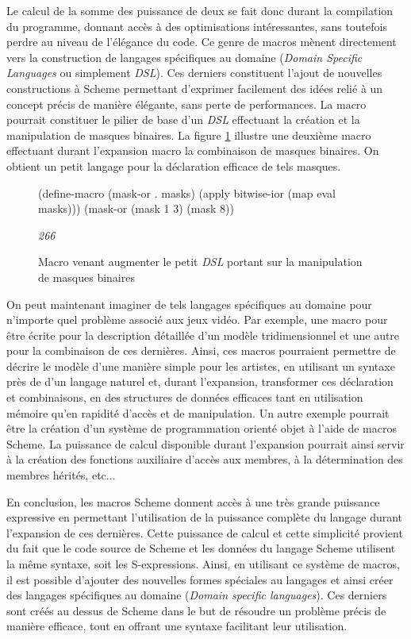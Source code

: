 \documentclass[12pt,oneside,letterpaper,francais]{book}
\newcommand{\scheme}[1]{\selectlanguage{english}{\tt #1}\selectlanguage{french}}
\newcommand{\schemeresult}[1]{{\it #1}}
\begin{document}
Le calcul de la somme des puissance de deux se fait donc durant la
compilation du programme, donnant accès à des optimisations
intéressantes, sans toutefois perdre au niveau de l'élégance du
code. Ce genre de macros mènent directement vers la construction de
langages spécifiques au domaine (\textit{Domain Specific Languages} ou
simplement \textit{DSL}). Ces derniers constituent l'ajout de
nouvelles constructions à Scheme permettant d'exprimer facilement des
idées relié à un concept précis de manière élégante, sans perte de
performances. La macro \scheme{mask} pourrait constituer le pilier de
base d'un \textit{DSL} effectuant la création et la manipulation de
masques binaires. La figure \ref{Scheme:macro-mini-dsl} illustre une
deuxième macro effectuant durant l'expansion macro la combinaison de
masques binaires. On obtient un petit langage pour la déclaration
efficace de tels masques. 

\begin{figure}[htb1]
  \begin{schemecode}
(define-macro (mask-or . masks)
  (apply bitwise-ior (map eval masks)))
(mask-or (mask 1 3) (mask 8))
  \end{schemecode}
  \schemeresult{266}
  \caption{Macro venant augmenter le petit \textit{DSL} portant sur la
    manipulation de masques binaires}
  \label{Scheme:macro-mini-dsl}
\end{figure}

On peut maintenant imaginer de tels langages spécifiques au domaine
pour n'importe quel problème associé aux jeux vidéo. Par exemple, une
macro pour être écrite pour la description détaillée d'un modèle
tridimensionnel et une autre pour la combinaison de ces
dernières. Ainsi, ces macros pourraient permettre de décrire le modèle
d'une manière simple pour les artistes, en utilisant un syntaxe près
de d'un langage naturel et, durant l'expansion, transformer ces
déclaration et combinaisons, en des structures de données efficaces
tant en utilisation mémoire qu'en rapidité d'accès et de
manipulation. Un autre exemple pourrait être la création d'un système
de programmation orienté objet à l'aide de macros Scheme. La puissance
de calcul disponible durant l'expansion pourrait ainsi servir à la
création des fonctions auxiliaire d'accès aux membres, à la
détermination des membres hérités, etc...

En conclusion, les macros Scheme donnent accès à une très grande
puissance expressive en permettant l'utilisation de la puissance
complète du langage durant l'expansion de ces dernières. Cette
puissance de calcul et cette simplicité provient du fait que le code
source de Scheme et les données du langage Scheme utilisent la même
syntaxe, soit les S-expressions. Ainsi, en utilisant ce système de
macros, il est possible d'ajouter des nouvelles formes spéciales au
langages et ainsi créer des langages spécifiques au domaine
(\textit{Domain specific languages}). Ces derniers sont créés au
dessus de Scheme dans le but de résoudre un problème précis de manière
efficace, tout en offrant une syntaxe facilitant leur utilisation.
\end{document}
